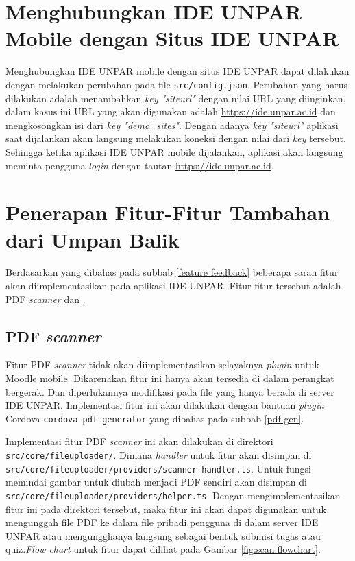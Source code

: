 \section{Menghubungkan IDE UNPAR Mobile dengan Situs IDE UNPAR}
\label{mobile:connect}
Menghubungkan IDE UNPAR mobile dengan situs IDE UNPAR dapat dilakukan dengan melakukan perubahan pada file \texttt{src/config.json}.  Perubahan yang harus dilakukan adalah menambahkan \textit{key} \textit{"siteurl"} dengan nilai URL yang diinginkan, dalam kasus ini URL yang akan digunakan adalah \url{https://ide.unpar.ac.id} dan mengkosongkan isi dari \textit{key "demo\_sites"}. Dengan adanya \textit{key "siteurl"} aplikasi saat dijalankan akan langsung melakukan koneksi dengan nilai dari \textit{key} tersebut. Sehingga ketika aplikasi IDE UNPAR mobile dijalankan, aplikasi akan langsung meminta pengguna \textit{login} dengan tautan \url{https://ide.unpar.ac.id}. 

\section{Penerapan Fitur-Fitur Tambahan dari Umpan Balik}
\label{feat:feedback}

Berdasarkan yang dibahas pada subbab \ref{feature feedback} beberapa saran fitur akan diimplementasikan pada aplikasi IDE UNPAR. Fitur-fitur tersebut adalah PDF \textit{scanner} dan .

\subsection{PDF \textit{scanner}}
\label{feat:pdfscan}
Fitur PDF \textit{scanner} tidak akan diimplementasikan selayaknya \textit{plugin} untuk Moodle mobile. Dikarenakan fitur ini hanya akan tersedia di dalam perangkat bergerak. Dan diperlukannya modifikasi pada file yang hanya berada di server IDE UNPAR. Implementasi fitur ini akan dilakukan dengan bantuan \textit{plugin} Cordova \texttt{cordova-pdf-generator} yang dibahas pada subbab \ref{pdf-gen}.
 
Implementasi fitur PDF \textit{scanner} ini akan dilakukan di direktori \texttt{src/core/fileuploader/}. Dimana \textit{handler} untuk fitur akan disimpan di \texttt{src/core/fileuploader/providers/scanner-handler.ts}. Untuk fungsi memindai gambar untuk diubah menjadi PDF sendiri akan disimpan di \\ \texttt{src/core/fileuploader/providers/helper.ts}. Dengan mengimplementasikan fitur ini pada direktori tersebut, maka fitur ini akan dapat digunakan untuk mengunggah file PDF ke dalam file pribadi pengguna di dalam server IDE UNPAR atau mengungghanya langsung sebagai bentuk submisi tugas atau quiz.\textit{Flow chart} untuk fitur dapat dilihat pada Gambar \ref{fig:scan:flowchart}. 

